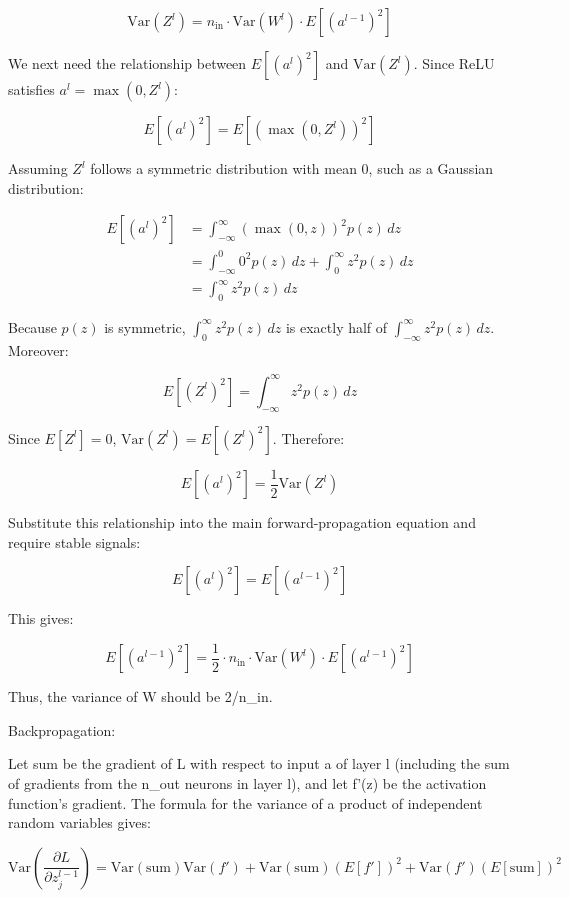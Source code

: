 \[
\mathrm{Var}(Z^l)=n_{\mathrm{in}}\cdot \mathrm{Var}(W^l)\cdot E[(a^{l-1})^2]
\]

We next need the relationship between \(E[(a^l)^2]\) and \(\mathrm{Var}(Z^l)\). Since ReLU satisfies \(a^l=\max(0,Z^l)\):

\[
E[(a^l)^2]=E[(\max(0,Z^l))^2]
\]

Assuming \(Z^l\) follows a symmetric distribution with mean 0, such as a Gaussian distribution:

\[
\begin{aligned}
E[(a^l)^2]
&=\int_{-\infty}^{\infty}(\max(0,z))^2p(z)\,dz\\
&=\int_{-\infty}^{0}0^2p(z)\,dz+\int_{0}^{\infty}z^2p(z)\,dz\\
&=\int_{0}^{\infty}z^2p(z)\,dz
\end{aligned}
\]

Because \(p(z)\) is symmetric, \(\int_0^\infty z^2p(z)\,dz\) is exactly half of \(\int_{-\infty}^{\infty}z^2p(z)\,dz\). Moreover:

\[
E[(Z^l)^2]=\int_{-\infty}^{\infty}z^2p(z)\,dz
\]

Since \(E[Z^l]=0\), \(\mathrm{Var}(Z^l)=E[(Z^l)^2]\). Therefore:

\[
E[(a^l)^2]=\frac{1}{2}\mathrm{Var}(Z^l)
\]

Substitute this relationship into the main forward-propagation equation and require stable signals:

\[
E[(a^l)^2]=E[(a^{l-1})^2]
\]

This gives:

\[
E[(a^{l-1})^2]
=\frac{1}{2}\cdot n_{\mathrm{in}}\cdot \mathrm{Var}(W^l)\cdot E[(a^{l-1})^2]
\]

Thus, the variance of W should be 2/n\_in.

Backpropagation:

Let sum be the gradient of L with respect to input a of layer l (including the sum of gradients from the n\_out neurons in layer l), and let f'(z) be the activation function's gradient. The formula for the variance of a product of independent random variables gives:

\[
\mathrm{Var}\left(\frac{\partial L}{\partial z_j^{l-1}}\right)
=\mathrm{Var}(\mathrm{sum})\mathrm{Var}(f')
+\mathrm{Var}(\mathrm{sum})(E[f'])^2
+\mathrm{Var}(f')(E[\mathrm{sum}])^2
\]

